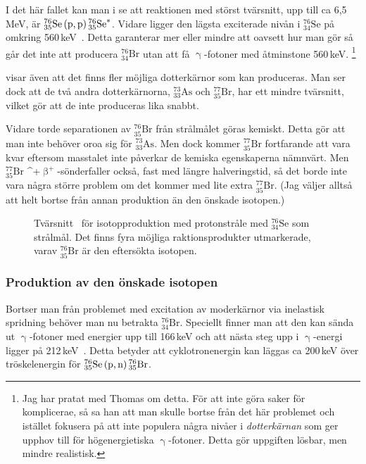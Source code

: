 \documentclass[11pt,a4paper, german, english, swedish
]{article}
\newcommand{\BP}{\ifmmode\upbeta^{+}\else$\upbeta^{\!+}$\fi}
\newcommand{\G}{\ifmmode\upgamma\else$\upgamma$\fi}
\begin{document}
I det här fallet kan man i  se att reaktionen med störst tvärsnitt, upp till ca 6,5\,MeV, är $^{76}_{35}\mathrm{Se}\,(\text{p,\,p})\,^{76}_{35}\mathrm{Se}^*$. Vidare ligger den lägsta exciterade nivån i $^{76}_{34}\mathrm{Se}$ på omkring 560\,keV~\cite{NNDC_levels}. Detta garanterar mer eller mindre att oavsett hur man gör så går det inte att producera $^{76}_{34}\mathrm{Br}$ utan att få \G-fotoner med åtminstone 560\,keV.
\footnote{
Jag har pratat med Thomas om detta. För att inte göra saker för komplicerae, så sa han att man skulle bortse från det här problemet och istället fokusera på att inte populera några nivåer i \emph{dotterkärnan} som ger upphov till för högenergietiska \G-fotoner. Detta gör uppgiften lösbar, men mindre realistisk.}

 visar även att det finns fler möjliga dotterkärnor som kan produceras. Man ser dock att de två andra dotterkärnorna, $^{73}_{33}\mathrm{As}$ och $^{77}_{35}\mathrm{Br}$, har ett mindre tvärsnitt, vilket gör att de inte produceras lika snabbt. 

Vidare torde separationen av $^{76}_{35}\mathrm{Br}$ från strålmålet göras kemiskt. Detta gör att man inte behöver oroa sig för $^{73}_{33}\mathrm{As}$. Men dock kommer $^{77}_{35}\mathrm{Br}$ fortfarande att vara kvar eftersom masstalet inte påverkar de kemiska egenskaperna nämnvärt. Men $^{77}_{35}\mathrm{Br}$ \BP-sönderfaller också, fast med längre halveringstid, så det borde inte vara några större problem om det kommer med lite extra $^{77}_{35}\mathrm{Br}$. (Jag väljer alltså att helt bortse från annan produktion än den önskade isotopen.)

\begin{figure}\centering

\caption{Tvärsnitt~\cite{PingPong} för isotopproduktion med protonstråle med $^{76}_{34}\mathrm{Se}$ som strålmål. Det finns fyra möjliga raktionsprodukter utmarkerade, varav $^{76}_{35}\mathrm{Br}$ är den eftersökta isotopen. }
\label{fig:x-sect}
\end{figure}


\subsubsection{Produktion av den önskade isotopen}
Bortser man från problemet med excitation av moderkärnor via inelastisk spridning behöver man nu betrakta $^{76}_{34}\mathrm{Br}$. Speciellt finner man att den kan sända ut \G-fotoner med energier upp till 166\,keV och att nästa steg upp i \G-energi ligger på 212\,keV~\cite{NNDC_levels}. Detta betyder att cyklotronenergin kan läggas ca 200\,keV över tröskelenergin för $^{76}_{35}\mathrm{Se}\,(\text{p,\,n})\,^{76}_{35}\mathrm{Br}$.
\end{document}
